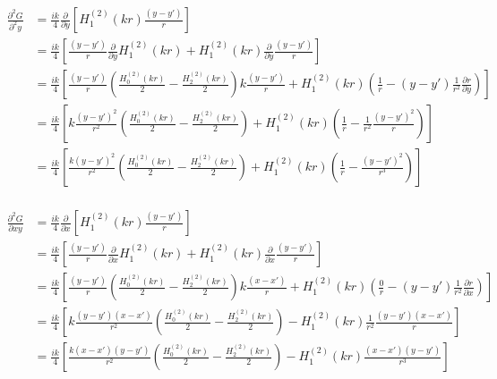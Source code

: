 \documentclass{article}
\newcommand{\0}{\varnothing}
\begin{document}
\begin{align*}
    \frac{\partial^2 G}{\partial^2 y} &= \frac{ik}{4} \frac{\partial }{\partial y} \left[H_{1}^{(2)}(kr) \frac{(y-y')}{r} \right]\\
    &= \frac{ik}{4} \left[ \frac{(y-y')}{r} \frac{\partial }{\partial y} H_{1}^{(2)}(kr)  + 
                        H_{1}^{(2)}(kr) \frac{\partial }{\partial y}  \frac{(y-y')}{r} \right] \\
    &= \frac{ik}{4} \left[ \frac{(y-y')}{r} \left( \frac{H_{0}^{(2)}(kr)}{2} - \frac{H_{2}^{(2)}(kr)}{2} \right) k \frac{(y-y')}{r}  + 
                        H_{1}^{(2)}(kr) \left( \frac{1}{r} - (y-y')\frac{1}{r^2} \frac{\partial r} {\partial y} \right) \right] \\
    &= \frac{ik}{4} \left[ k \frac{(y-y')^2}{r^2} \left( \frac{H_{0}^{(2)}(kr)}{2} - \frac{H_{2}^{(2)}(kr)}{2} \right)  + H_{1}^{(2)}(kr) \left( \frac{1}{r} - \frac{1}{r^2} \frac{(y-y')^2}{r} \right) \right] \\
    &= \frac{ik}{4} \left[ \frac{k(y-y')^2}{r^2} \left( \frac{H_{0}^{(2)}(kr)}{2} - \frac{H_{2}^{(2)}(kr)}{2} \right) + 
        H_{1}^{(2)}(kr)\left(\frac{1}{r} - \frac{(y-y')^2}{r^3} \right)  \right] \\
\end{align*}

\begin{align*}
    \frac{\partial^2 G}{\partial xy} &= \frac{ik}{4} \frac{\partial }{\partial x} \left[H_{1}^{(2)}(kr) \frac{(y-y')}{r} \right]\\
    &= \frac{ik}{4} \left[ \frac{(y-y')}{r} \frac{\partial }{\partial x} H_{1}^{(2)}(kr)  + 
                        H_{1}^{(2)}(kr) \frac{\partial }{\partial x}  \frac{(y-y')}{r} \right] \\
    &= \frac{ik}{4} \left[ \frac{(y-y')}{r} \left( \frac{H_{0}^{(2)}(kr)}{2} - \frac{H_{2}^{(2)}(kr)}{2} \right) k \frac{(x-x')}{r}  + 
                        H_{1}^{(2)}(kr) \left( \frac{0}{r} - (y-y')\frac{1}{r^2} \frac{\partial r} {\partial x} \right) \right] \\
    &= \frac{ik}{4} \left[ k \frac{(y-y')(x-x')}{r^2} \left( \frac{H_{0}^{(2)}(kr)}{2} - \frac{H_{2}^{(2)}(kr)}{2} \right)  - H_{1}^{(2)}(kr) \frac{1}{r^2} \frac{(y-y')(x-x')}{r}  \right] \\
    &= \frac{ik}{4} \left[ \frac{k(x-x')(y-y')}{r^2} \left( \frac{H_{0}^{(2)}(kr)}{2} - \frac{H_{2}^{(2)}(kr)}{2} \right) -
        H_{1}^{(2)}(kr)\frac{(x-x')(y-y')}{r^3}  \right] \\
\end{align*}
\end{document}
